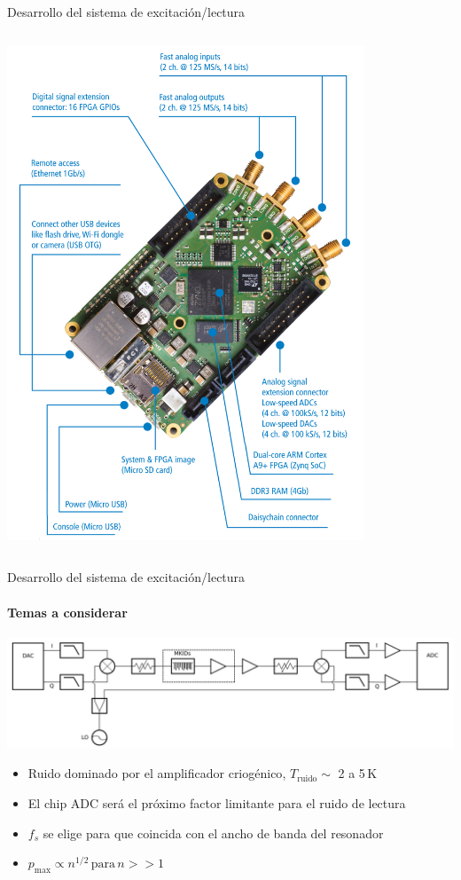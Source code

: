 \documentclass[ignorenonframetext,12pt]{beamer}
\begin{document}
\begin{frame}{Desarrollo del sistema de excitación/lectura}
\begin{columns}
\begin{column}{0.5\textwidth}
												\includegraphics[width=0.8\textwidth]{rp_sistema_2}
								\end{column}
				\end{columns}
\end{frame}

\begin{frame}{Desarrollo del sistema de excitación/lectura}
				\framesubtitle{Temas a considerar}
				\centering
				\includegraphics[width=\textwidth]{readout1}

				\begin{itemize}
								\item Ruido \alert{dominado por el amplificador criogénico},
												$T_\text{ruido} \sim$ 2 a 5\,K 
								\item \alert{El chip ADC será el próximo factor
												limitante para el ruido de lectura}
								\item	$f_s$ se elige para que
												coincida con el ancho de banda del resonador
								\item $p_\text{max} \propto	n^{1/2}\,\text{para}\,n >> 1$
				\end{itemize}

\end{frame}
\end{document}
